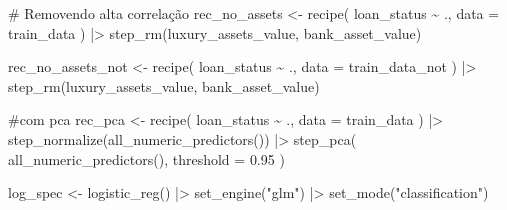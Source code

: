 \documentclass[
  letterpaper,
  DIV=11,
  numbers=noendperiod]{scrartcl}
\newenvironment{Shaded}{\begin{snugshade}}{\end{snugshade}}
\newcommand{\AttributeTok}[1]{\textcolor[rgb]{0.40,0.45,0.13}{#1}}
\newcommand{\CommentTok}[1]{\textcolor[rgb]{0.37,0.37,0.37}{#1}}
\newcommand{\FloatTok}[1]{\textcolor[rgb]{0.68,0.00,0.00}{#1}}
\newcommand{\FunctionTok}[1]{\textcolor[rgb]{0.28,0.35,0.67}{#1}}
\newcommand{\NormalTok}[1]{\textcolor[rgb]{0.00,0.23,0.31}{#1}}
\newcommand{\OtherTok}[1]{\textcolor[rgb]{0.00,0.23,0.31}{#1}}
\newcommand{\SpecialCharTok}[1]{\textcolor[rgb]{0.37,0.37,0.37}{#1}}
\newcommand{\StringTok}[1]{\textcolor[rgb]{0.13,0.47,0.30}{#1}}
\begin{document}
\begin{Shaded}
\begin{Highlighting}[]
\CommentTok{\# Removendo alta correlação}
\NormalTok{rec\_no\_assets }\OtherTok{\textless{}{-}} \FunctionTok{recipe}\NormalTok{(}
\NormalTok{  loan\_status }\SpecialCharTok{\textasciitilde{}}\NormalTok{ .,}
  \AttributeTok{data =}\NormalTok{ train\_data}
\NormalTok{) }\SpecialCharTok{|\textgreater{}}
  \FunctionTok{step\_rm}\NormalTok{(luxury\_assets\_value, bank\_asset\_value)}
  
\NormalTok{rec\_no\_assets\_not }\OtherTok{\textless{}{-}} \FunctionTok{recipe}\NormalTok{(}
\NormalTok{  loan\_status }\SpecialCharTok{\textasciitilde{}}\NormalTok{ .,}
  \AttributeTok{data =}\NormalTok{ train\_data\_not}
\NormalTok{) }\SpecialCharTok{|\textgreater{}}
  \FunctionTok{step\_rm}\NormalTok{(luxury\_assets\_value, bank\_asset\_value)}


\CommentTok{\#com pca}
\NormalTok{rec\_pca }\OtherTok{\textless{}{-}} \FunctionTok{recipe}\NormalTok{(}
\NormalTok{  loan\_status }\SpecialCharTok{\textasciitilde{}}\NormalTok{ .,}
  \AttributeTok{data =}\NormalTok{ train\_data}
\NormalTok{) }\SpecialCharTok{|\textgreater{}}
  \FunctionTok{step\_normalize}\NormalTok{(}\FunctionTok{all\_numeric\_predictors}\NormalTok{()) }\SpecialCharTok{|\textgreater{}}
  \FunctionTok{step\_pca}\NormalTok{(}
    \FunctionTok{all\_numeric\_predictors}\NormalTok{(),}
    \AttributeTok{threshold =} \FloatTok{0.95}
\NormalTok{  )}
\end{Highlighting}
\end{Shaded}

\begin{Shaded}
\begin{Highlighting}[]
\NormalTok{log\_spec }\OtherTok{\textless{}{-}} \FunctionTok{logistic\_reg}\NormalTok{() }\SpecialCharTok{|\textgreater{}}
  \FunctionTok{set\_engine}\NormalTok{(}\StringTok{"glm"}\NormalTok{) }\SpecialCharTok{|\textgreater{}}
  \FunctionTok{set\_mode}\NormalTok{(}\StringTok{"classification"}\NormalTok{)}
\end{Highlighting}
\end{Shaded}
\end{document}
